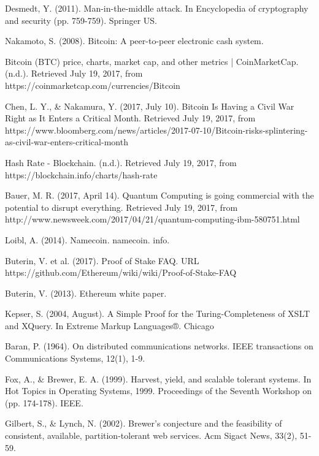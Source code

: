 \begin{thebibliography}{99}
Desmedt, Y. (2011). Man-in-the-middle attack. In Encyclopedia of cryptography and security (pp. 759-759). Springer US.

Nakamoto, S. (2008). Bitcoin: A peer-to-peer electronic cash system.

Bitcoin (BTC) price, charts, market cap, and other metrics | CoinMarketCap. (n.d.). Retrieved July 19, 2017, from https://coinmarketcap.com/currencies/Bitcoin

Chen, L. Y., \& Nakamura, Y. (2017, July 10). Bitcoin Is Having a Civil War Right as It Enters a Critical Month. Retrieved July 19, 2017, from https://www.bloomberg.com/news/articles/2017-07-10/Bitcoin-risks-splintering-as-civil-war-enters-critical-month

Hash Rate - Blockchain. (n.d.). Retrieved July 19, 2017, from https://blockchain.info/charts/hash-rate

Bauer, M. R. (2017, April 14). Quantum Computing is going commercial with the potential to disrupt everything. Retrieved July 19, 2017, from http://www.newsweek.com/2017/04/21/quantum-computing-ibm-580751.html

Loibl, A. (2014). Namecoin. namecoin. info.

Buterin, V. et al. (2017). Proof of Stake FAQ. URL https://github.com/Ethereum/wiki/wiki/Proof-of-Stake-FAQ

Buterin, V. (2013). Ethereum white paper.

Kepser, S. (2004, August). A Simple Proof for the Turing-Completeness of XSLT and XQuery. In Extreme Markup Languages®.
Chicago 


Baran, P. (1964). On distributed communications networks. IEEE transactions on Communications Systems, 12(1), 1-9.

Fox, A., \& Brewer, E. A. (1999). Harvest, yield, and scalable tolerant systems. In Hot Topics in Operating Systems, 1999. Proceedings of the Seventh Workshop on (pp. 174-178). IEEE.

Gilbert, S., \& Lynch, N. (2002). Brewer's conjecture and the feasibility of consistent, available, partition-tolerant web services. Acm Sigact News, 33(2), 51-59.


\end{thebibliography}
